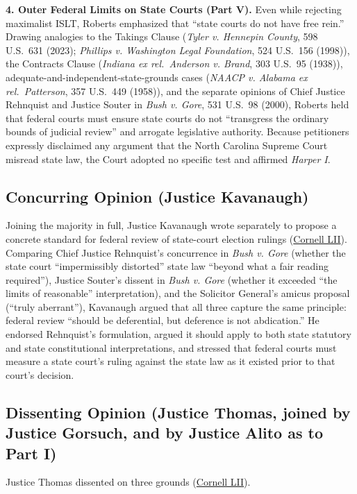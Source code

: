 \documentclass[12pt]{article}
\begin{document}
\textbf{4. Outer Federal Limits on State Courts (Part V).} Even while rejecting maximalist ISLT, Roberts emphasized that ``state courts do not have free rein.'' Drawing analogies to the Takings Clause (\textit{Tyler v. Hennepin County}, 598 U.S.\ 631 (2023); \textit{Phillips v. Washington Legal Foundation}, 524 U.S.\ 156 (1998)), the Contracts Clause (\textit{Indiana ex rel.\ Anderson v. Brand}, 303 U.S.\ 95 (1938)), adequate-and-independent-state-grounds cases (\textit{NAACP v. Alabama ex rel.\ Patterson}, 357 U.S.\ 449 (1958)), and the separate opinions of Chief Justice Rehnquist and Justice Souter in \textit{Bush v. Gore}, 531 U.S.\ 98 (2000), Roberts held that federal courts must ensure state courts do not ``transgress the ordinary bounds of judicial review'' and arrogate legislative authority. Because petitioners expressly disclaimed any argument that the North Carolina Supreme Court misread state law, the Court adopted no specific test and affirmed \textit{Harper I}.

\subsection{Concurring Opinion (Justice Kavanaugh)}
Joining the majority in full, Justice Kavanaugh wrote separately to propose a concrete standard for federal review of state-court election rulings (\href{https://www.law.cornell.edu/supremecourt/text/21-1271}{Cornell LII}). Comparing Chief Justice Rehnquist's concurrence in \textit{Bush v. Gore} (whether the state court ``impermissibly distorted'' state law ``beyond what a fair reading required''), Justice Souter's dissent in \textit{Bush v. Gore} (whether it exceeded ``the limits of reasonable'' interpretation), and the Solicitor General's amicus proposal (``truly aberrant''), Kavanaugh argued that all three capture the same principle: federal review ``should be deferential, but deference is not abdication.'' He endorsed Rehnquist's formulation, argued it should apply to both state statutory and state constitutional interpretations, and stressed that federal courts must measure a state court's ruling against the state law as it existed prior to that court's decision.

\subsection{Dissenting Opinion (Justice Thomas, joined by Justice Gorsuch, and by Justice Alito as to Part I)}
Justice Thomas dissented on three grounds (\href{https://www.law.cornell.edu/supremecourt/text/21-1271}{Cornell LII}).
\end{document}
